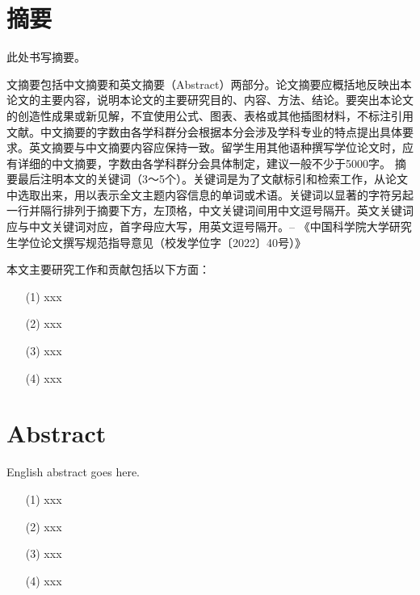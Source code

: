 
\maketitle%
\MAKETITLE%
\makedeclaration%
\intobmk\chapter*{摘\quad 要}%
\setcounter{page}{1}%

此处书写摘要。

文摘要包括中文摘要和英文摘要（Abstract）两部分。论文摘要应概括地反映出本论文的主要内容，说明本论文的主要研究目的、内容、方法、结论。要突出本论文的创造性成果或新见解，不宜使用公式、图表、表格或其他插图材料，不标注引用文献。中文摘要的字数由各学科群分会根据本分会涉及学科专业的特点提出具体要求。英文摘要与中文摘要内容应保持一致。留学生用其他语种撰写学位论文时，应有详细的中文摘要，字数由各学科群分会具体制定，建议一般不少于5000字。
摘要最后注明本文的关键词（3～5个）。关键词是为了文献标引和检索工作，从论文中选取出来，用以表示全文主题内容信息的单词或术语。关键词以显著的字符另起一行并隔行排列于摘要下方，左顶格，中文关键词间用中文逗号隔开。英文关键词应与中文关键词对应，首字母应大写，用英文逗号隔开。-- 《中国科学院大学研究生学位论文撰写规范指导意见（校发学位字〔2022〕40号）》



本文主要研究工作和贡献包括以下方面：

\begin{itemize}
    \item[(1)] xxx
    \item[(2)] xxx
    \item[(3)] xxx
    \item[(4)] xxx
\end{itemize}

\intobmk\chapter*{Abstract}%
\pagestyle{enfrontmatterstyle}%

English abstract goes here.

\begin{itemize}
    \item[(1)] xxx
    \item[(2)] xxx
    \item[(3)] xxx
    \item[(4)] xxx
\end{itemize}




\cleardoublepage\pagestyle{frontmatterstyle}%

